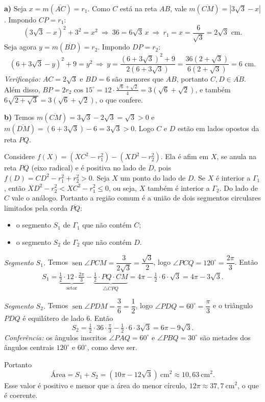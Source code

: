 \documentclass{article}%
\begin{document}
\textbf{a)} Seja $x=m(\overline{AC})=r_1$. Como $C$ está na reta $AB$, vale $m(\overline{CM})=|3\sqrt3-x|$. Impondo $CP=r_1$:
\[
(3\sqrt3-x)^2+3^2=x^2\ \Rightarrow\ 36=6\sqrt3\,x\ \Rightarrow\ r_1=x=\frac{6}{\sqrt3}=2\sqrt3\text{ cm}.
\]
Seja agora $y=m(\overline{BD})=r_2$. Impondo $DP=r_2$:
\[
(6+3\sqrt3-y)^2+9=y^2\ \Rightarrow\ y=\frac{(6+3\sqrt3)^2+9}{2(6+3\sqrt3)}=\frac{36(2+\sqrt3)}{6(2+\sqrt3)}=6\text{ cm}.
\]
\emph{Verificação:} $AC=2\sqrt3$ e $BD=6$ são menores que $AB$, portanto $C,D\in\overline{AB}$. Além disso, $BP=2r_2\cos15^\circ=12\cdot\frac{\sqrt6+\sqrt2}{4}=3(\sqrt6+\sqrt2)$, e também $6\sqrt{2+\sqrt3}=3(\sqrt6+\sqrt2)$, o que confere.

\textbf{b)} Temos $m(\overline{CM})=3\sqrt3-2\sqrt3=\sqrt3>0$ e $m(\overline{DM})=(6+3\sqrt3)-6=3\sqrt3>0$. Logo $C$ e $D$ estão em lados opostos da reta $PQ$.

Considere $f(X)=(XC^2-r_1^2)-(XD^2-r_2^2)$. Ela é afim em $X$, se anula na reta $PQ$ (eixo radical) e é positiva no lado de $D$, pois $f(D)=CD^2-r_1^2+r_2^2>0$. Seja $X$ um ponto do lado de $D$. Se $X$ é interior a $\Gamma_1$, então $XD^2-r_2^2<XC^2-r_1^2\le 0$, ou seja, $X$ também é interior a $\Gamma_2$. Do lado de $C$ vale o análogo. Portanto a região comum é a união de dois segmentos circulares limitados pela corda $\overline{PQ}$:
\begin{itemize}
\item o segmento $S_1$ de $\Gamma_1$ que não contém $C$;
\item o segmento $S_2$ de $\Gamma_2$ que não contém $D$.
\end{itemize}

\emph{Segmento $S_1$.} Temos $\operatorname{sen}\angle PCM=\dfrac{3}{2\sqrt3}=\dfrac{\sqrt3}{2}$, logo $\angle PCQ=120^\circ=\dfrac{2\pi}{3}$. Então
\[
S_1=\underbrace{\tfrac12\cdot 12\cdot\tfrac{2\pi}{3}}_{\text{setor}}-\underbrace{\tfrac12\cdot PQ\cdot CM}_{\triangle CPQ}=4\pi-\tfrac12\cdot6\cdot\sqrt3=4\pi-3\sqrt3.
\]

\emph{Segmento $S_2$.} Temos $\operatorname{sen}\angle PDM=\dfrac{3}{6}=\dfrac12$, logo $\angle PDQ=60^\circ=\dfrac{\pi}{3}$ e o triângulo $PDQ$ é equilátero de lado $6$. Então
\[
S_2=\tfrac12\cdot36\cdot\tfrac{\pi}{3}-\tfrac12\cdot6\cdot3\sqrt3=6\pi-9\sqrt3.
\]
\emph{Conferência:} os ângulos inscritos $\angle PAQ=60^\circ$ e $\angle PBQ=30^\circ$ são metades dos ângulos centrais $120^\circ$ e $60^\circ$, como deve ser.

Portanto
\[
\text{Área}=S_1+S_2=(10\pi-12\sqrt3)\ \text{cm}^2\approx 10{,}63\ \text{cm}^2 .
\]
Esse valor é positivo e menor que a área do menor círculo, $12\pi\approx37{,}7\ \text{cm}^2$, o que é coerente.
\end{document}

